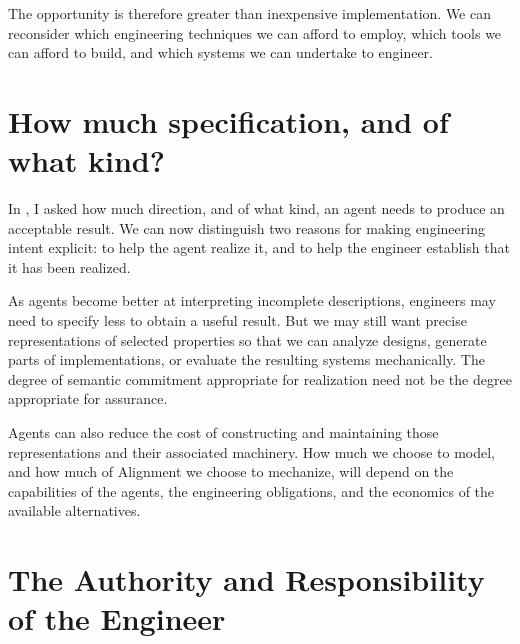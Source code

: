 The opportunity is therefore greater than inexpensive implementation. We can reconsider which engineering techniques we can afford to employ, which tools we can afford to build, and which systems we can undertake to engineer.

\section{How much specification, and of what kind?}\label{heading:how-much-specification-and-of-what-kind}

In , I asked how much direction, and of what kind, an agent needs to produce an acceptable result. We can now distinguish two reasons for making engineering intent explicit: to help the agent realize it, and to help the engineer establish that it has been realized.

As agents become better at interpreting incomplete descriptions, engineers may need to specify less to obtain a useful result. But we may still want precise representations of selected properties so that we can analyze designs, generate parts of implementations, or evaluate the resulting systems mechanically. The degree of semantic commitment appropriate for realization need not be the degree appropriate for assurance.

Agents can also reduce the cost of constructing and maintaining those representations and their associated machinery. How much we choose to model, and how much of Alignment we choose to mechanize, will depend on the capabilities of the agents, the engineering obligations, and the economics of the available alternatives.

\section{The Authority and Responsibility of the Engineer}\label{heading:the-part-that-stays-yours}

